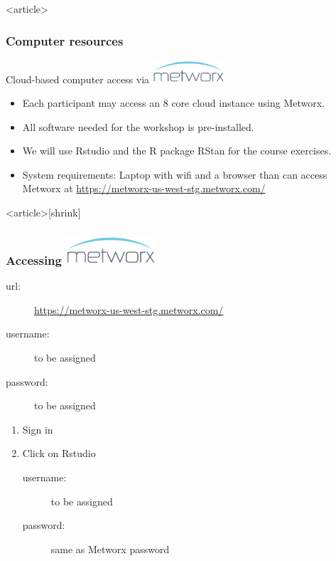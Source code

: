 \documentclass{beamer}
\begin{document}
\begin{frame}<article>
  \frametitle{Computer resources}

Cloud-based computer access via \href{http://metrumrg.com/solution/metworx/}{\includegraphics[width=0.2\textwidth]{graphics/metworx.pdf}} 
\begin{itemize}
\item Each participant may access an 8 core cloud instance using
  Metworx.
\item All software needed for the workshop is pre-installed.
\item We will use Rstudio and the R package RStan for the course
  exercises.
\item System requirements: Laptop with wifi and a browser than can
  access Metworx at \url{https://metworx-us-west-stg.metworx.com/}
\end{itemize}
  
\end{frame}

\begin{frame}<article>[shrink]
  \frametitle{Accessing \href{https://www.metrumrg.com/solution/metworx/}{\includegraphics[width=0.25\textwidth]{graphics/metworx.pdf}} }
  
  \begin{description}
  \item[url:] \url{https://metworx-us-west-stg.metworx.com/}
\item[username:] to be assigned
\item[password:] to be assigned
  \end{description}
  \begin{enumerate}
  \item Sign in
\item Click on Rstudio 
  \begin{description}
  \item[username:] to be assigned
\item[password:] same as Metworx password
   \end{description}
  \end{enumerate}

\end{frame}
\end{document}
